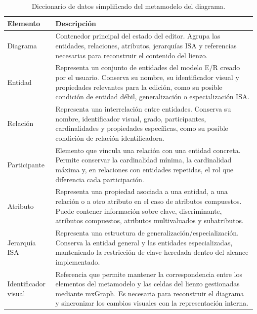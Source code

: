 \begin{table}[H]
\centering
\begin{tabular}{p{} p{}}
\textbf{Elemento} & \textbf{Descripción} \\
\hline
Diagrama & Contenedor principal del estado del editor. Agrupa las entidades, relaciones, atributos, jerarquías ISA y referencias necesarias para reconstruir el contenido del lienzo. \\

Entidad & Representa un conjunto de entidades del modelo E/R creado por el usuario. Conserva su nombre, su identificador visual y propiedades relevantes para la edición, como su posible condición de entidad débil, generalización o especialización ISA. \\

Relación & Representa una interrelación entre entidades. Conserva su nombre, identificador visual, grado, participantes, cardinalidades y propiedades específicas, como su posible condición de relación identificadora. \\

Participante & Elemento que vincula una relación con una entidad concreta. Permite conservar la cardinalidad mínima, la cardinalidad máxima y, en relaciones con entidades repetidas, el rol que diferencia cada participación. \\

Atributo & Representa una propiedad asociada a una entidad, a una relación o a otro atributo en el caso de atributos compuestos. Puede contener información sobre clave, discriminante, atributos compuestos, atributos multivaluados y subatributos. \\

Jerarquía ISA & Representa una estructura de generalización/especialización. Conserva la entidad general y las entidades especializadas, manteniendo la restricción de clave heredada dentro del alcance implementado. \\

Identificador visual & Referencia que permite mantener la correspondencia entre los elementos del metamodelo y las celdas del lienzo gestionadas mediante mxGraph. Es necesaria para reconstruir el diagrama y sincronizar los cambios visuales con la representación interna. \\
\end{tabular}
\caption{Diccionario de datos simplificado del metamodelo del diagrama.}
\label{tab:diccionario_metamodelo}
\end{table}

